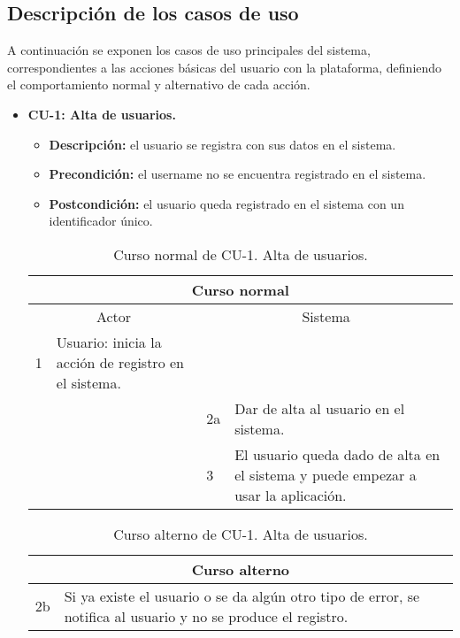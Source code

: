 \subsection{Descripción de los casos de uso}
A continuación se exponen los casos de uso principales del sistema, correspondientes a las acciones básicas del usuario con la plataforma, definiendo el comportamiento normal y alternativo de cada acción.

\begin{itemize}
	\item \textbf{CU-1: Alta de usuarios.}
	\begin{itemize}
		\item \textbf{Descripción:} el usuario se registra con sus datos en el sistema.
		\item \textbf{Precondición:} el username no se encuentra registrado en el sistema.
		\item \textbf{Postcondición:} el usuario queda registrado en el sistema con un identificador único.
	\end{itemize}
	\begin{table}[H]
		\centering
		\begin{tabular}{|p{0.3cm}|p{5cm}|p{0.3cm}|p{5cm}|}
			\hline
			\multicolumn{4}{|c|}{Curso normal} \\ \hline
			\multicolumn{2}{|c|}{Actor} & \multicolumn{2}{|c|}{Sistema} \\ \hline
			1 & Usuario: inicia la acción de registro en el sistema. &  &  \\ \hline
			&  & 2a & Dar de alta al usuario en el sistema. \\ \hline
			&  & 3 & El usuario queda dado de alta en el sistema y puede empezar a usar la aplicación. \\ \hline
		\end{tabular}
		\caption{Curso normal de CU-1. Alta de usuarios.}
		\label{tabla:cu1-normal}
	\end{table}
	
	\begin{table}[H]
		\centering
		\begin{tabular}{|p{0.3cm}|p{10cm}|}
			\hline
			\multicolumn{2}{|c|}{Curso alterno} \\ \hline
			2b & Si ya existe el usuario o se da algún otro tipo de error, se notifica al usuario y no se produce el registro. \\ \hline
		\end{tabular}
		\caption{Curso alterno de CU-1. Alta de usuarios.}
		\label{tabla:cu1-alterno}
	\end{table}
\end{itemize}


